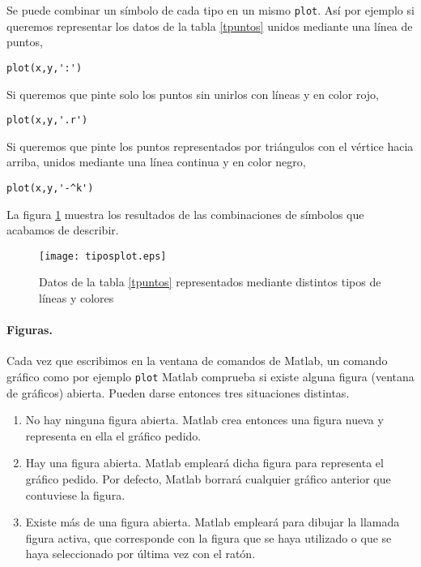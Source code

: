 Se puede combinar un símbolo de cada tipo en un mismo \texttt{plot}. Así por ejemplo si queremos representar los datos de la tabla \ref{tpuntos} unidos mediante una línea de puntos,
\begin{verbatim}
plot(x,y,':')
\end{verbatim} 

Si queremos que pinte solo los puntos sin unirlos con líneas y en color rojo,
\begin{verbatim}
plot(x,y,'.r')
\end{verbatim}

Si queremos que pinte los puntos representados por triángulos con el vértice hacia arriba, unidos mediante una línea continua y en color negro,

\begin{verbatim}
plot(x,y,'-^k')
\end{verbatim}

La figura \ref{fig:tplot} muestra los resultados de las combinaciones de símbolos que acabamos de describir.

\begin{figure}[h]
\centering
\texttt{[image: tiposplot.eps]}
\caption{Datos de la tabla \ref{tpuntos} representados mediante distintos tipos de líneas y colores}
\label{fig:tplot}
\end{figure}

\paragraph{Figuras.} Cada vez que escribimos en la ventana de comandos de Matlab, un comando gráfico como por ejemplo \texttt{plot} Matlab comprueba si existe alguna figura (ventana de gráficos) abierta. Pueden darse entonces tres situaciones distintas. 

\begin{enumerate}
\item No hay ninguna figura abierta. Matlab crea entonces una figura nueva y representa en ella el gráfico pedido.
\item Hay una figura abierta. Matlab empleará dicha figura para representa el gráfico pedido. Por defecto, Matlab borrará cualquier gráfico anterior que contuviese la figura.
\item Existe más de una figura abierta. Matlab empleará para dibujar la llamada figura activa, que corresponde con la figura que se haya utilizado o que se haya seleccionado por última vez con el ratón.
\end{enumerate}

